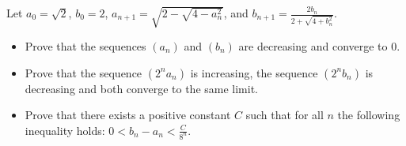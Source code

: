 Let \(a_{0}=\sqrt{2}\), \(b_{0}=2\), \(a_{n+1}=\sqrt{2-\sqrt{4-a_{n}^{2}}}\), and \(b_{n+1}=\frac{2b_{n}}{2+\sqrt{4+b_{n}^{2}}}\).
\begin{itemize}
\item[(a)] Prove that the sequences \((a_{n})\) and \((b_{n})\) are decreasing and converge to \(0\).
\item[(b)] Prove that the sequence \((2^{n}a_{n})\) is increasing,  the sequence \((2^{n}b_{n})\) is decreasing and
both converge to the same limit.
\item[(c)] Prove that there exists a positive constant \(C\) such that for all \(n\)  the following inequality holds: \(0 <b_{n}-a_{n} <\frac{C}{8^{n}}\).
\end{itemize}
